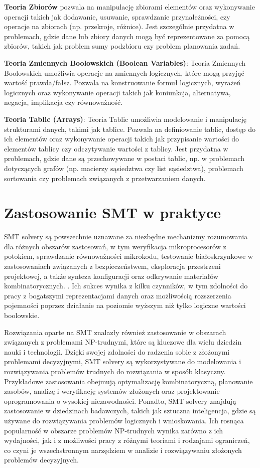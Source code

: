 \textbf{Teoria Zbiorów} pozwala na manipulację zbiorami elementów oraz wykonywanie operacji takich jak dodawanie, usuwanie, sprawdzanie przynależności, czy operacje na zbiorach (np. przekroje, różnice). Jest szczególnie przydatna w problemach, gdzie dane lub zbiory danych mogą być reprezentowane za pomocą zbiorów, takich jak problem sumy podzbioru czy problem planowania zadań.

\textbf{Teoria Zmiennych Boolowskich (Boolean Variables)}:
Teoria Zmiennych Boolowskich umożliwia operacje na zmiennych logicznych, które mogą przyjąć wartość prawda/fałsz. Pozwala na konstruowanie formuł logicznych, wyrażeń logicznych oraz wykonywanie operacji takich jak koniunkcja, alternatywa, negacja, implikacja czy równoważność. 

\textbf{Teoria Tablic (Arrays)}:
Teoria Tablic umożliwia modelowanie i manipulację strukturami danych, takimi jak tablice. Pozwala na definiowanie tablic, dostęp do ich elementów oraz wykonywanie operacji takich jak przypisanie wartości do elementów tablicy czy odczytywanie wartości z tablicy. Jest przydatna w problemach, gdzie dane są przechowywane w postaci tablic, np. w problemach dotyczących grafów (np. macierzy sąsiedztwa czy list sąsiedztwa), problemach sortowania czy problemach związanych z przetwarzaniem danych.

\section{Zastosowanie SMT w praktyce}
SMT solvery są powszechnie uznawane za niezbędne mechanizmy rozumowania dla różnych obszarów zastosowań, w tym weryfikacja mikroprocesorów z potokiem, sprawdzanie równoważności mikrokodu, testowanie białoskrzynkowe w zastosowaniach związanych z bezpieczeństwem, eksploracja przestrzeni projektowej, a także synteza konfiguracji oraz odkrywanie materiałów kombinatorycznych. \cite{BarbosaBBKLMMMN22}. Ich sukces wynika z kilku czynników, w tym zdolności do pracy z bogatszymi reprezentacjami danych oraz możliwością rozszerzenia pojemności poprzez działanie na poziomie wyższym niż tylko logiczne wartości boolowskie. 

Rozwiązania oparte na SMT znalazły również zastosowanie w obszarach związanych z problemami NP-trudnymi, które są kluczowe dla wielu dziedzin nauki i technologii. Dzięki swojej zdolności do radzenia sobie z złożonymi problemami decyzyjnymi, SMT solvery są wykorzystywane do modelowania i rozwiązywania problemów trudnych do rozwiązania w sposób klasyczny. Przykładowe zastosowania obejmują optymalizację kombinatoryczną, planowanie zasobów, analizę i weryfikację systemów złożonych oraz projektowanie oprogramowania o wysokiej niezawodności. Ponadto, SMT solvery znajdują zastosowanie w dziedzinach badawczych, takich jak sztuczna inteligencja, gdzie są używane do rozwiązywania problemów logicznych i wnioskowania. Ich rosnąca popularność w obszarze problemów NP-trudnych wynika zarówno z ich wydajności, jak i z możliwości pracy z różnymi teoriami i rodzajami ograniczeń, co czyni je wszechstronnym narzędziem w analizie i rozwiązywaniu złożonych problemów decyzyjnych.
